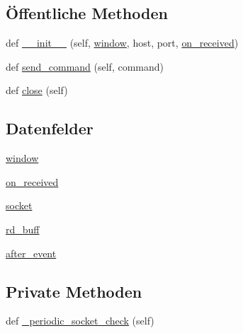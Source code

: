 \subsection*{Öffentliche Methoden}
\begin{DoxyCompactItemize}
\item 
def \hyperlink{class_f_i_n_a_l___g_u_i___w_l_a_n_1_1_arduino_a86404a4415caa006d76a1b7afa696fee}{\+\_\+\+\_\+init\+\_\+\+\_\+} (self, \hyperlink{class_f_i_n_a_l___g_u_i___w_l_a_n_1_1_arduino_a04a8a2bbfa9c15500892b8e5033d625b}{window}, host, port, \hyperlink{class_f_i_n_a_l___g_u_i___w_l_a_n_1_1_arduino_a7d39fd2404163714885928c07d431b76}{on\+\_\+received})
\item 
def \hyperlink{class_f_i_n_a_l___g_u_i___w_l_a_n_1_1_arduino_a05097bd2ea4ca3b2c17d7b7164a67539}{send\+\_\+command} (self, command)
\item 
def \hyperlink{class_f_i_n_a_l___g_u_i___w_l_a_n_1_1_arduino_a8639372c33e15084a7f7c4d9d87b7bfe}{close} (self)
\end{DoxyCompactItemize}
\subsection*{Datenfelder}
\begin{DoxyCompactItemize}
\item 
\hyperlink{class_f_i_n_a_l___g_u_i___w_l_a_n_1_1_arduino_a04a8a2bbfa9c15500892b8e5033d625b}{window}
\item 
\hyperlink{class_f_i_n_a_l___g_u_i___w_l_a_n_1_1_arduino_a7d39fd2404163714885928c07d431b76}{on\+\_\+received}
\item 
\hyperlink{class_f_i_n_a_l___g_u_i___w_l_a_n_1_1_arduino_a84edc84c8145e7997b70f9919ce44d68}{socket}
\item 
\hyperlink{class_f_i_n_a_l___g_u_i___w_l_a_n_1_1_arduino_a1ea8c1aa4f00109a4c17150885fd08c8}{rd\+\_\+buff}
\item 
\hyperlink{class_f_i_n_a_l___g_u_i___w_l_a_n_1_1_arduino_a5299b01fe1537dddabd0e50400e0e9be}{after\+\_\+event}
\end{DoxyCompactItemize}
\subsection*{Private Methoden}
\begin{DoxyCompactItemize}
\item 
def \hyperlink{class_f_i_n_a_l___g_u_i___w_l_a_n_1_1_arduino_ae9e6aab11376e92d980b2c9f2c7d3883}{\+\_\+periodic\+\_\+socket\+\_\+check} (self)
\end{DoxyCompactItemize}


